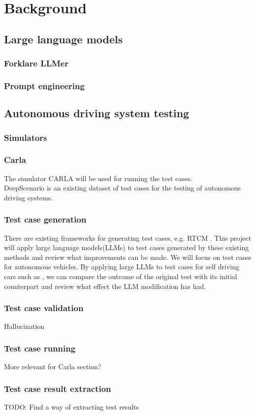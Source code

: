 \section{Background}



\subsection{Large language models}
\subsubsection{Forklare LLMer}
\subsubsection{Prompt engineering}
\subsection{Autonomous driving system testing}
\subsubsection{Simulators}
\subsubsection{Carla}

The simulator CARLA\cite{Dosovitskiy17} will be used for running the test cases.\\
DeepScenario\cite{DeepScenario} is an existing dataset of test cases for the testing of autonomous driving systems.

\subsubsection{Test case generation}

There are existing frameworks for generating test cases, e.g. RTCM \cite{RTCM}. This project will apply large language models(LLMs) to test cases generated by these existing methods and review what improvements can be made. 
We will focus on test cases for autonomous vehicles.
By applying large LLMs to test cases for self driving cars such as \cite{DeepScenario, CriticalScenarios}, we can compare the outcome of the original test with its initial counterpart and review what effect the LLM modification has had. 

\subsubsection{Test case validation}
Hallucination
\subsubsection{Test case running}
More relevant for Carla section?
\subsubsection{Test case result extraction}
TODO: Find a way of extracting test results